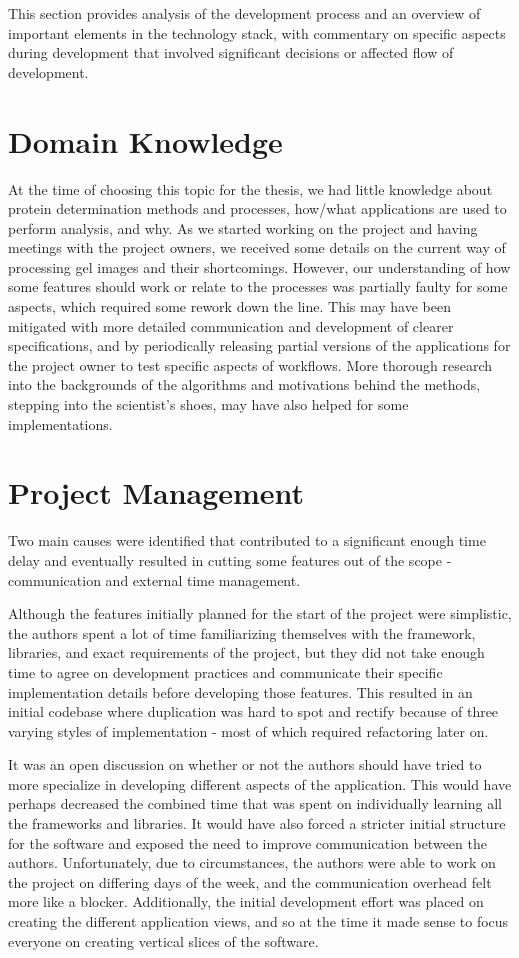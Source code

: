 This section provides analysis of the development process and an overview of important elements in the technology stack, with commentary on specific aspects during development that involved significant decisions or affected flow of development.

\section{Domain Knowledge}
At the time of choosing this topic for the thesis, we had little knowledge about protein determination methods and processes, how/what applications are used to perform analysis, and why. As we started working on the project and having meetings with the project owners, we received some details on the current way of processing gel images and their shortcomings. However, our understanding of how some features should work or relate to the processes was partially faulty for some aspects, which required some rework down the line. This may have been mitigated with more detailed communication and development of clearer specifications, and by periodically releasing partial versions of the applications for the project owner to test specific aspects of workflows. More thorough research into the backgrounds of the algorithms and motivations behind the methods, stepping into the scientist's shoes, may have also helped for some implementations.

\section{Project Management}

Two main causes were identified that contributed to a significant enough time delay and eventually resulted in cutting some features out of the scope - communication and external time management.

Although the features initially planned for the start of the project were simplistic, the authors spent a lot of time familiarizing themselves with the framework, libraries, and exact requirements of the project, but they did not take enough time to agree on development practices and communicate their specific implementation details before developing those features. This resulted in an initial codebase where duplication was hard to spot and rectify because of three varying styles of implementation - most of which required refactoring later on. 

It was an open discussion on whether or not the authors should have tried to more specialize in developing different aspects of the application. This would have perhaps decreased the combined time that was spent on individually learning all the frameworks and libraries. It would have also forced a stricter initial structure for the software and exposed the need to improve communication between the authors. Unfortunately, due to circumstances, the authors were able to work on the project on differing days of the week, and the communication overhead felt more like a blocker. Additionally, the initial development effort was placed on creating the different application views, and so at the time it made sense to focus everyone on creating vertical slices of the software.

